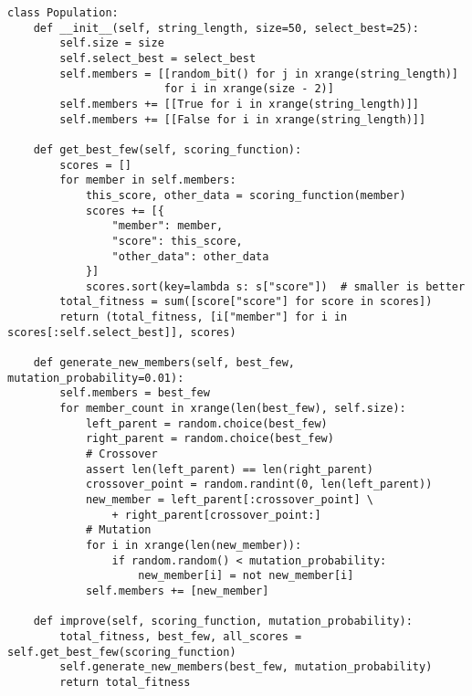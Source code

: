 \begin{minipage}{\textwidth+2cm}
  \begin{lstlisting}
class Population:
    def __init__(self, string_length, size=50, select_best=25):
        self.size = size
        self.select_best = select_best
        self.members = [[random_bit() for j in xrange(string_length)]
                        for i in xrange(size - 2)]
        self.members += [[True for i in xrange(string_length)]]
        self.members += [[False for i in xrange(string_length)]]

    def get_best_few(self, scoring_function):
        scores = []
        for member in self.members:
            this_score, other_data = scoring_function(member)
            scores += [{
                "member": member,
                "score": this_score,
                "other_data": other_data
            }]
            scores.sort(key=lambda s: s["score"])  # smaller is better
        total_fitness = sum([score["score"] for score in scores])
        return (total_fitness, [i["member"] for i in scores[:self.select_best]], scores)

    def generate_new_members(self, best_few, mutation_probability=0.01):
        self.members = best_few
        for member_count in xrange(len(best_few), self.size):
            left_parent = random.choice(best_few)
            right_parent = random.choice(best_few)
            # Crossover
            assert len(left_parent) == len(right_parent)
            crossover_point = random.randint(0, len(left_parent))
            new_member = left_parent[:crossover_point] \
                + right_parent[crossover_point:]
            # Mutation
            for i in xrange(len(new_member)):
                if random.random() < mutation_probability:
                    new_member[i] = not new_member[i]
            self.members += [new_member]

    def improve(self, scoring_function, mutation_probability):
        total_fitness, best_few, all_scores = self.get_best_few(scoring_function)
        self.generate_new_members(best_few, mutation_probability)
        return total_fitness
  \end{lstlisting}
\end{minipage}%
